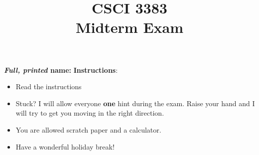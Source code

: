 \documentclass[12pt]{article}
\title{CSCI 3383 \\Midterm Exam}
\date{}
\begin{document}
\maketitle
\textbf{\emph{Full, printed} name: }
\vspace{1cm}
\textbf{Instructions}: 
\begin{itemize}
    \item Read the instructions
    \item Stuck? I will allow everyone \textbf{one} hint during the exam. Raise your hand and I will try to get you moving in the right direction.  
    \item You are allowed scratch paper and a calculator. 
    \item Have a wonderful holiday break!
\end{itemize} 
\end{document}
